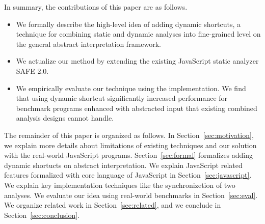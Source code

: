 In summary, the contributions of this paper are as follows.
\begin{itemize}
\item We formally describe the high-level idea of adding dynamic shortcuts, a
  technique for combining static and dynamic analyses into fine-grained level on
  the general abstract interpretation framework.
\item We actualize our method by extending the existing JavaScript static analyzer SAFE 2.0.
\item We empirically evaluate our technique using the implementation.
  We find that using dynamic shortcut significantly increased performance for
  benchmark programs enhanced with abstracted input that existing combined
  analysis designs cannot handle.
\end{itemize}
The remainder of this paper is organized as follows.
In Section~\ref{sec:motivation}, we explain more details about limitations of
existing techniques and our solution with the real-world JavaScript programs.
Section~\ref{sec:formal} formalizes adding dynamic shortucts on abstract
interpretation.
We explain JavaScript related features formalized with core language of
JavaScript in Section~\ref{sec:javascript}.
We explain key implementation techniques like the synchronizetion of two analyses.
We evaluate our idea using real-world benchmarks in Section~\ref{sec:eval}.
We organize related work in Section~\ref{sec:related}, and we conclude in Section~\ref{sec:conclusion}.


